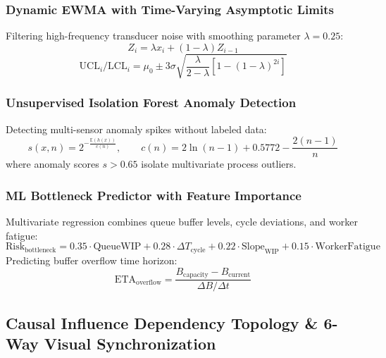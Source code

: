 \documentclass[11pt]{article}
\begin{document}
\subsubsection{Dynamic EWMA with Time-Varying Asymptotic Limits}

Filtering high-frequency transducer noise with smoothing parameter $\lambda = 0.25$:
\begin{equation}
Z_i = \lambda x_i + (1 - \lambda) Z_{i-1}
\end{equation}
\begin{equation}
\text{UCL}_i / \text{LCL}_i = \mu_0 \pm 3\sigma \sqrt{\frac{\lambda}{2 - \lambda}\left[1 - (1 - \lambda)^{2i}\right]}
\end{equation}

\subsubsection{Unsupervised Isolation Forest Anomaly Detection}

Detecting multi-sensor anomaly spikes without labeled data:
\begin{equation}
s(x, n) = 2^{-\frac{\mathbb{E}(h(x))}{c(n)}}, \qquad c(n) = 2\ln(n - 1) + 0.5772 - \frac{2(n - 1)}{n}
\end{equation}
where anomaly scores $s > 0.65$ isolate multivariate process outliers.

\subsubsection{ML Bottleneck Predictor with Feature Importance}

Multivariate regression combines queue buffer levels, cycle deviations, and worker fatigue:
\begin{equation}
\text{Risk}_{\text{bottleneck}} = 0.35 \cdot \text{QueueWIP} + 0.28 \cdot \Delta T_{\text{cycle}} + 0.22 \cdot \text{Slope}_{\text{WIP}} + 0.15 \cdot \text{WorkerFatigue}
\end{equation}
Predicting buffer overflow time horizon:
\begin{equation}
\text{ETA}_{\text{overflow}} = \frac{B_{\text{capacity}} - B_{\text{current}}}{\Delta B / \Delta t}
\end{equation}

\subsection{Causal Influence Dependency Topology \& 6-Way Visual Synchronization}
\end{document}

